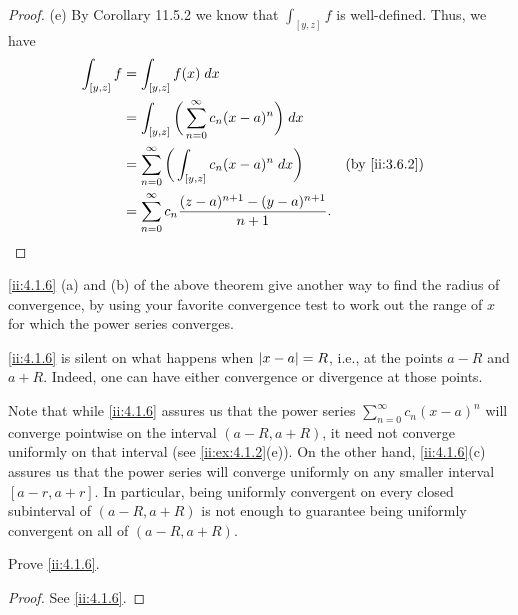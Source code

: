 \begin{proof}{(e)}
  By Corollary 11.5.2 we know that \(\int_{[y, z]} f\) is well-defined.
  Thus, we have
  \begin{align*}
    \int_{[y, z]} f & = \int_{[y, z]} f(x) \; dx                                                                     \\
                    & = \int_{[y, z]} \bigg(\sum_{n = 0}^\infty c_n (x - a)^n\bigg) \; dx                            \\
                    & = \sum_{n = 0}^\infty \bigg(\int_{[y, z]} c_n (x - a)^n \; dx\bigg)         &  & \by{ii:3.6.2} \\
                    & = \sum_{n = 0}^\infty c_n \dfrac{(z - a)^{n + 1} - (y - a)^{n + 1}}{n + 1}.
  \end{align*}
\end{proof}

\begin{note}
  \cref{ii:4.1.6} (a) and (b) of the above theorem give another way to find the radius of convergence, by using your favorite convergence test to work out the range of \(x\) for which the power series converges.
\end{note}

\setcounter{thm}{7}
\begin{rmk}\label{ii:4.1.8}
  \cref{ii:4.1.6} is silent on what happens when \(\left\lvert x - a\right\rvert = R\), i.e., at the points \(a - R\) and \(a + R\).
  Indeed, one can have either convergence or divergence at those points.
\end{rmk}

\begin{rmk}\label{ii:4.1.9}
  Note that while \cref{ii:4.1.6} assures us that the power series \(\sum_{n = 0}^\infty c_n (x - a)^n\) will converge pointwise on the interval \((a - R, a + R)\), it need not converge uniformly on that interval
  (see \cref{ii:ex:4.1.2}(e)).
  On the other hand, \cref{ii:4.1.6}(c) assures us that the power series will converge uniformly on any smaller interval \([a - r, a + r]\).
  In particular, being uniformly convergent on every closed subinterval of \((a - R, a + R)\) is not enough to guarantee being uniformly convergent on all of \((a - R, a + R)\).
\end{rmk}

\exercisesection

\begin{ex}\label{ii:ex:4.1.1}
  Prove \cref{ii:4.1.6}.
\end{ex}

\begin{proof}
  See \cref{ii:4.1.6}.
\end{proof}

